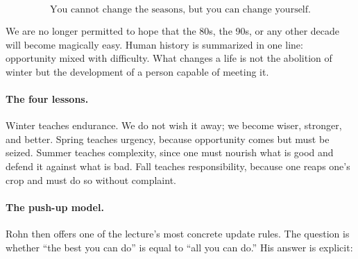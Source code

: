 \begin{equation}
\text{You cannot change the seasons, but you can change yourself.}
\end{equation}

We are no longer permitted to hope that the 80s, the 90s, or any other decade will become magically easy. Human history is summarized in one line: opportunity mixed with difficulty. What changes a life is not the abolition of winter but the development of a person capable of meeting it.

\begin{figure}
\centering
{}
\end{figure}

\paragraph{The four lessons.}
Winter teaches endurance. We do not wish it away; we become wiser, stronger, and better. Spring teaches urgency, because opportunity comes but must be seized. Summer teaches complexity, since one must nourish what is good and defend it against what is bad. Fall teaches responsibility, because one reaps one's crop and must do so without complaint.

\paragraph{The push-up model.}
Rohn then offers one of the lecture's most concrete update rules. The question is whether ``the best you can do'' is equal to ``all you can do.'' His answer is explicit:

